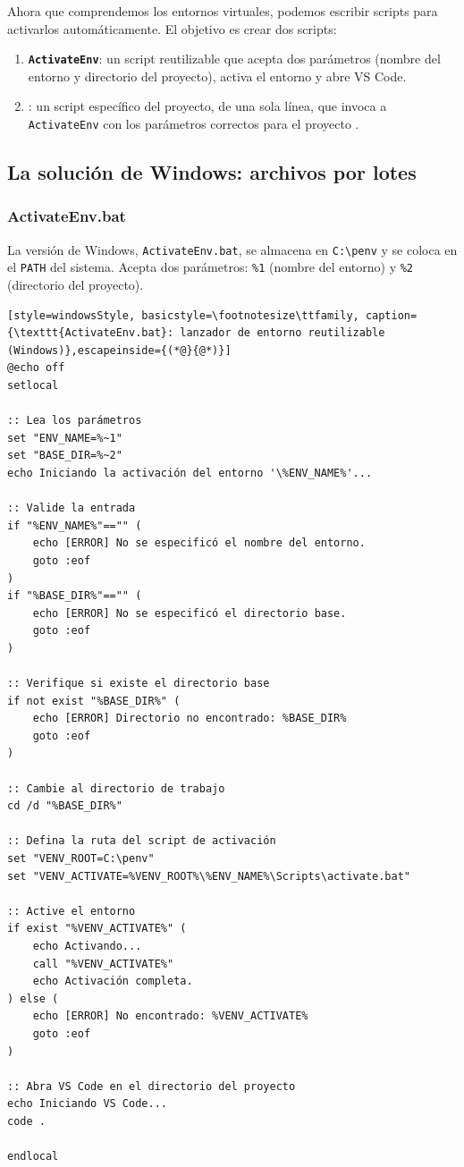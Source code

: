 Ahora que comprendemos los entornos virtuales, podemos escribir scripts para
activarlos automáticamente. El objetivo es crear dos scripts:

\begin{enumerate}
  \item \textbf{\texttt{ActivateEnv}}: un script reutilizable que acepta
        dos parámetros (nombre del entorno y directorio del proyecto),
        activa el entorno y abre VS Code.
  \item \textbf{\texttt{\ProjectName}}: un script específico del proyecto,
        de una sola línea, que invoca a \texttt{ActivateEnv} con los
        parámetros correctos para el proyecto \ProjectName{}.
\end{enumerate}

\subsection{La solución de Windows: archivos por lotes}

\subsubsection{ActivateEnv.bat}

La versión de Windows, \texttt{ActivateEnv.bat}, se almacena en
\texttt{C:\textbackslash penv} y se coloca en el \texttt{PATH} del sistema.
Acepta dos parámetros: \texttt{\%1} (nombre del entorno) y \texttt{\%2}
(directorio del proyecto).

\begin{lstlisting}[style=windowsStyle, basicstyle=\footnotesize\ttfamily, caption={\texttt{ActivateEnv.bat}: lanzador de entorno reutilizable (Windows)},escapeinside={(*@}{@*)}]
@echo off
setlocal

:: Lea los parámetros
set "ENV_NAME=%~1"
set "BASE_DIR=%~2"
echo Iniciando la activación del entorno '\%ENV_NAME%'...

:: Valide la entrada
if "%ENV_NAME%"=="" (
    echo [ERROR] No se especificó el nombre del entorno.
    goto :eof
)
if "%BASE_DIR%"=="" (
    echo [ERROR] No se especificó el directorio base.
    goto :eof
)

:: Verifique si existe el directorio base
if not exist "%BASE_DIR%" (
    echo [ERROR] Directorio no encontrado: %BASE_DIR%
    goto :eof
)

:: Cambie al directorio de trabajo
cd /d "%BASE_DIR%"

:: Defina la ruta del script de activación
set "VENV_ROOT=C:\penv"
set "VENV_ACTIVATE=%VENV_ROOT%\%ENV_NAME%\Scripts\activate.bat"

:: Active el entorno
if exist "%VENV_ACTIVATE%" (
    echo Activando...
    call "%VENV_ACTIVATE%"
    echo Activación completa.
) else (
    echo [ERROR] No encontrado: %VENV_ACTIVATE%
    goto :eof
)

:: Abra VS Code en el directorio del proyecto
echo Iniciando VS Code...
code .

endlocal
\end{lstlisting}


